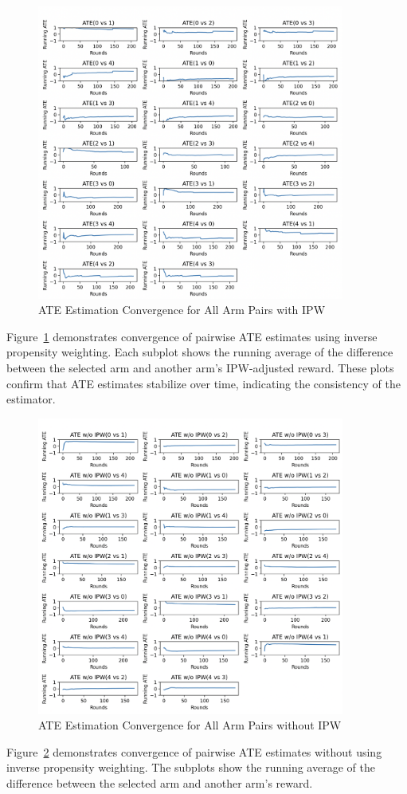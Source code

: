 \begin{figure}[H]
\centering
\includegraphics[width=0.9\textwidth]{ATE_with_IPW.png}
\caption{ATE Estimation Convergence for All Arm Pairs with IPW}
\label{fig:ate_pairs}
\end{figure}

Figure~\ref{fig:ate_pairs} demonstrates convergence of pairwise ATE estimates using inverse propensity weighting. Each subplot shows the running average of the difference between the selected arm and another arm’s IPW-adjusted reward. These plots confirm that ATE estimates stabilize over time, indicating the consistency of the estimator.

\begin{figure}[H]
\centering
\includegraphics[width=0.9\textwidth]{ATE_without_IPW.png}
\caption{ATE Estimation Convergence for All Arm Pairs without IPW}
\label{fig:ate_pairs_no_ipw}
\end{figure}

Figure~\ref{fig:ate_pairs_no_ipw} demonstrates convergence of pairwise ATE estimates without using inverse propensity weighting. The subplots show the running average of the difference between the selected arm and another arm’s reward.